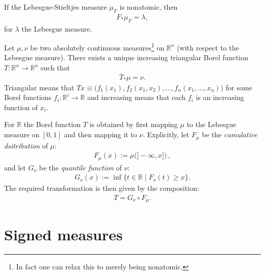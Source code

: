     \begin{property}
        If the Lebesgue-Stieltjes measure $\mu_F$ is nonatomic, then
        \begin{gather}
            F_\ast\mu_F = \lambda,
        \end{gather}
        for $\lambda$ the Lebesgue measure.
    \end{property}

    \begin{property}
        Let $\mu,\nu$ be two absolutely continuous measures\footnote{In fact  one can relax this to merely being nonatomic.} on $\mathbb{R}^n$ (with respect to the Lebesgue measure). There exists a unique increasing triangular Borel function $T:\mathbb{R}^n\rightarrow\mathbb{R}^n$ such that
        \begin{gather}
            T_\ast\mu = \nu.
        \end{gather}
        Triangular means that $Tx\equiv\big(f_1(x_1),f_2(x_1,x_2),\ldots,f_n(x_1,\ldots,x_n)\big)$ for some Borel functions $f_i:\mathbb{R}^i\rightarrow\mathbb{R}$ and increasing means that each $f_i$ is an increasing function of $x_i$.
    \end{property}
    \begin{remark}
        For $\mathbb{R}$ the Borel function $T$ is obtained by first mapping $\mu$ to the Lebesgue measure on $[0,1]$ and then mapping it to $\nu$. Explicitly, let $F_\mu$ be the \textit{cumulative dsitribution} of $\mu$:
        \begin{gather}
            F_\mu(x) := \mu\big(]-\infty,x]\big)\,,
        \end{gather}
        and let $G_\nu$ be the \textit{quantile function} of $\nu$:
        \begin{gather}
            G_\nu(x) := \inf\{t\in\mathbb{R}\mid F_\nu(t)\geq x\}.
        \end{gather}
        The required transformation is then given by the composition:
        \begin{gather}
            T = G_\nu\circ F_\mu.
        \end{gather}
    \end{remark}

\section{Signed measures}

